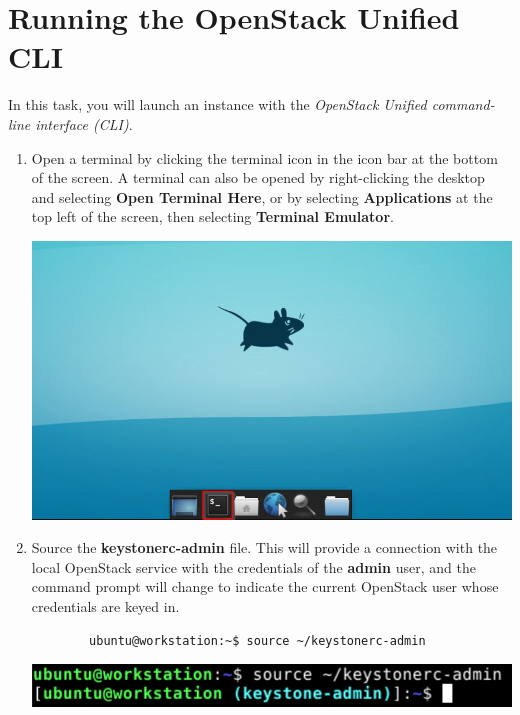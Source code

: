 \documentclass[letterpaper, 12pt]{article}
\begin{document}
\section{Running the OpenStack Unified CLI}
In this task, you will launch an instance with the \textit{OpenStack Unified command-line interface (CLI)}.

\begin{enumerate}
    \item Open a terminal by clicking the terminal icon in the icon bar at the bottom of the screen.
    A terminal can also be opened by right-clicking the desktop and selecting \textbf{Open Terminal Here}, or by selecting \textbf{Applications} at the top left of the screen, then selecting \textbf{Terminal Emulator}.

    \begin{center}
        \includegraphics[width=\linewidth]{images/part2/step1.png}
    \end{center}

    \item Source the \textbf{keystonerc-admin} file.
    This will provide a connection with the local OpenStack service with the credentials of the \textbf{admin} user, and the command prompt will change to indicate the current OpenStack user whose credentials are keyed in.
    \begin{lstlisting}
        ubuntu@workstation:~$ source ~/keystonerc-admin
    \end{lstlisting}

    \begin{center}
        \includegraphics[width=\linewidth]{images/part2/step2.png}
    \end{center}


\end{enumerate}
\end{document}
